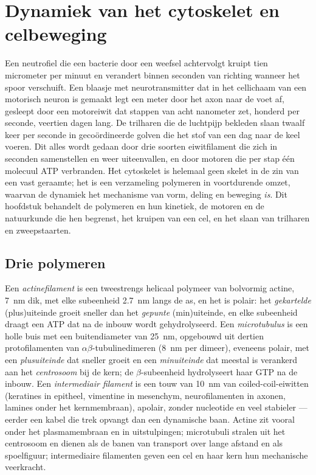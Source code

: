 \chapter{Dynamiek van het cytoskelet en celbeweging}\label{ch:b3:cytoskeleton-motility}

Een neutrofiel die een bacterie door een weefsel achtervolgt kruipt
tien micrometer per minuut en verandert binnen seconden van richting
wanneer het spoor verschuift. Een blaasje met neurotransmitter dat in
het cellichaam van een motorisch neuron is gemaakt legt een meter door
het axon naar de voet af, gesleept door een motoreiwit dat stappen van
acht nanometer zet, honderd per seconde, veertien dagen lang. De
trilharen die de luchtpijp bekleden slaan twaalf keer per seconde in
gecoördineerde golven die het stof van een dag naar de keel voeren. Dit
alles wordt gedaan door drie soorten eiwitfilament die zich in seconden
samenstellen en weer uiteenvallen, en door motoren die per stap één
molecuul ATP verbranden. Het cytoskelet is helemaal geen skelet in de
zin van een vast geraamte; het is een verzameling polymeren in
voortdurende omzet, waarvan de dynamiek het mechanisme van vorm,
deling en beweging \emph{is}. Dit hoofdstuk behandelt de polymeren en
hun kinetiek, de motoren en de natuurkunde die hen begrenst, het
kruipen van een cel, en het slaan van trilharen en zweepstaarten.

\section{Drie polymeren}

\begin{definition}\label{def:b3:cytoskeleton-motility:filaments}
Een \emph{actinefilament} is een tweestrengs helicaal polymeer van
bolvormig actine, \qty{7}{nm} dik, met elke subeenheid \qty{2.7}{nm}
langs de as, en het is polair: het \emph{gekartelde} (plus)uiteinde
groeit sneller dan het \emph{gepunte} (min)uiteinde, en elke
subeenheid draagt een ATP dat na de inbouw wordt gehydrolyseerd. Een
\emph{microtubulus} is een holle buis met een buitendiameter van
\qty{25}{nm}, opgebouwd uit dertien protofilamenten van
$\alpha\beta$-tubulinedimeren (\qty{8}{nm} per dimeer), eveneens
polair, met een \emph{plusuiteinde} dat sneller groeit en een
\emph{minuiteinde} dat meestal is verankerd aan het \emph{centrosoom}
bij de kern; de $\beta$-subeenheid hydrolyseert haar GTP na de inbouw.
Een \emph{intermediair filament} is een touw van \qty{10}{nm} van
coiled-coil-eiwitten (keratines in epitheel, vimentine in mesenchym,
neurofilamenten in axonen, lamines onder het kernmembraan), apolair,
zonder nucleotide en veel stabieler --- eerder een kabel die trek
opvangt dan een dynamische baan. Actine zit vooral onder het
plasmamembraan en in uitstulpingen; microtubuli stralen uit het
centrosoom en dienen als de banen van transport over lange afstand en
als spoelfiguur; intermediaire filamenten geven een cel en haar kern
hun mechanische veerkracht.
\end{definition}

